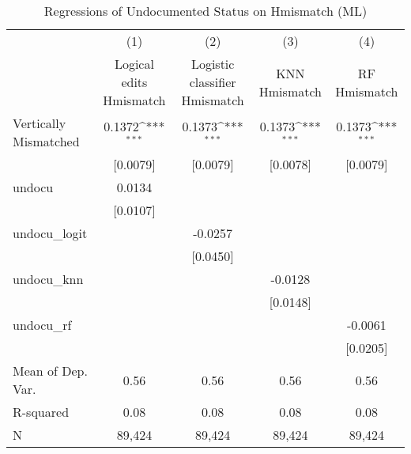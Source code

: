 \begin{table}[htbp]\centering
\def\sym#1{\ifmmode^{#1}\else\(^{#1}\)\fi}
\caption{Regressions of Undocumented Status on Hmismatch (ML)}
\begin{tabular}{l*{4}{c}}
\toprule
                    &\multicolumn{1}{c}{(1)}         &\multicolumn{1}{c}{(2)}         &\multicolumn{1}{c}{(3)}         &\multicolumn{1}{c}{(4)}         \\
                    &Logical edits Hmismatch         &Logistic classifier Hmismatch         &KNN Hmismatch         &RF Hmismatch         \\
\midrule
Vertically Mismatched&      0.1372\sym{***}&      0.1373\sym{***}&      0.1373\sym{***}&      0.1373\sym{***}\\
                    &    [0.0079]         &    [0.0079]         &    [0.0078]         &    [0.0079]         \\
\addlinespace
undocu              &      0.0134         &                     &                     &                     \\
                    &    [0.0107]         &                     &                     &                     \\
\addlinespace
undocu\_logit        &                     &     -0.0257         &                     &                     \\
                    &                     &    [0.0450]         &                     &                     \\
\addlinespace
undocu\_knn          &                     &                     &     -0.0128         &                     \\
                    &                     &                     &    [0.0148]         &                     \\
\addlinespace
undocu\_rf           &                     &                     &                     &     -0.0061         \\
                    &                     &                     &                     &    [0.0205]         \\
\midrule
Mean of Dep. Var.   &        0.56         &        0.56         &        0.56         &        0.56         \\
R-squared           &        0.08         &        0.08         &        0.08         &        0.08         \\
N                   &      89,424         &      89,424         &      89,424         &      89,424         \\

\end{tabular}
\end{table}

